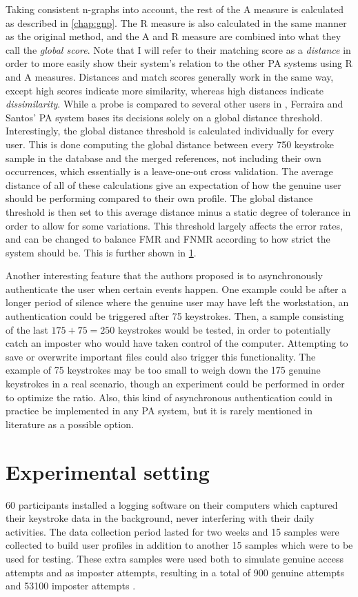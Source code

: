 \documentclass[informationsecurity]{gucmasterproject}
\begin{document}
Taking consistent n-graphs into account, the rest of the A measure is calculated as described in \cref{chap:gnp}. The R measure is also calculated in the same manner as the original method, and the A and R measure are combined into what they call the \textit{global score}.
Note that I will refer to their matching score as a \textit{distance} in order to more easily show their system's relation to the other PA systems using R and A measures. 
Distances and match scores generally work in the same way, except high scores indicate more similarity, whereas high distances indicate \textit{dissimilarity}.
While a probe is compared to several other users in \cite{gnp, Messerman}, Ferraira and Santos' PA system bases its decisions solely on a global distance threshold.
Interestingly, the global distance threshold is calculated individually for every user.
This is done computing the global distance between every 750 keystroke sample in the database and the merged references, not including their own occurrences, which essentially is a leave-one-out cross validation.
The average distance of all of these calculations give an expectation of how the genuine user should be performing compared to their own profile.
The global distance threshold is then set to this average distance minus a static degree of tolerance in order to allow for some variations.
This threshold largely affects the error rates, and can be changed to balance FMR and FNMR according to how strict the system should be.
This is further shown in \cref{sec:ferreira-experiment}.

Another interesting feature that the authors proposed is to asynchronously authenticate the user when certain events happen.
One example could be after a longer period of silence where the genuine user may have left the workstation, an authentication could be triggered after 75 keystrokes.
Then, a sample consisting of the last $175 + 75 = 250$ keystrokes would be tested, in order to potentially catch an imposter who would have taken control of the computer.
Attempting to save or overwrite important files could also trigger this functionality.
The example of 75 keystrokes may be too small to weigh down the 175 genuine keystrokes in a real scenario, though an experiment could be performed in order to optimize the ratio.
Also, this kind of asynchronous authentication could in practice be implemented in any PA system, but it is rarely mentioned in literature as a possible option.

\section{Experimental setting}
\label{sec:ferreira-experiment}
60 participants installed a logging software on their computers which captured their keystroke data in the background, never interfering with their daily activities.
The data collection period lasted for two weeks and 15 samples were collected to build user profiles in addition to another 15 samples which were to be used for testing.
These extra samples were used both to simulate genuine access attempts and as imposter attempts, resulting in a total of 900 genuine attempts and 53100 imposter attempts \cite{superResults}.
\end{document}
